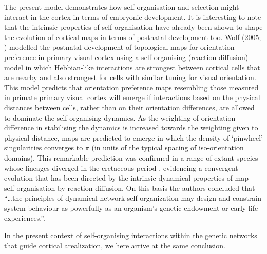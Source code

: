 \documentclass[10pt,letterpaper]{article}
\begin{document}
The present model demonstrates how self-organisation and selection might interact in the cortex in terms of embryonic development. It is interesting to note that the intrinsic properties of self-organisation have already been shown to shape the evolution of cortical maps in terms of postnatal development too. Wolf (2005; \cite{Wolf2005}) modelled the postnatal development of topological maps for orientation preference in primary visual cortex using a self-organising (reaction-diffusion) model in which Hebbian-like interactions are strongest between cortical cells that are nearby and also strongest for cells with similar tuning for visual orientation. This model predicts that orientation preference maps resembling those measured in primate primary visual cortex will emerge if interactions based on the physical distances between cells, rather than on their orientation differences, are allowed to dominate the self-organising dynamics. As the weighting of orientation difference in stabilising the dynamics is increased towards the weighting given to physical distance, maps are predicted to emerge in which the density of `pinwheel' singularities converges to $\pi$ (in units of the typical spacing of iso-orientation domains). This remarkable prediction was confirmed in a range of extant species whose lineages diverged in the cretaceous period \cite{Kaschube2010}, evidencing a convergent evolution that has been directed by the intrinsic dynamical properties of map self-organisation by reaction-diffusion. On this basis the authors concluded that ``\ldots the principles of dynamical network self-organization may design and constrain system behaviour as powerfully as an organism's genetic endowment or early life experiences.''. 

In the present context of self-organising interactions within the genetic networks that guide cortical arealization, we here arrive at the same conclusion.


\end{document}

